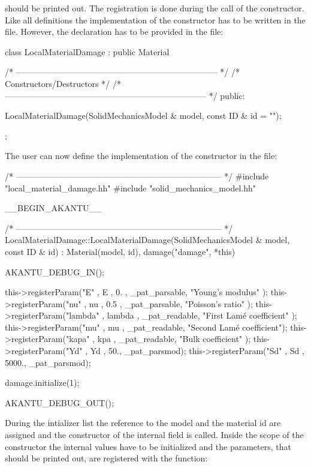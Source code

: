 should be printed out. The registration is done during the call of the
constructor. Like all definitions the implementation of the
constructor has to be written in the 
file. However, the declaration has to be provided in the
 file:
\begin{cpp}
class LocalMaterialDamage : public Material {
  /* ------------------------------------------------------------------------ */
  /* Constructors/Destructors                                                 */
  /* ------------------------------------------------------------------------ */
public:

  LocalMaterialDamage(SolidMechanicsModel & model, const ID & id = "");
};
\end{cpp}
The user can now define the implementation of the constructor in the
 file:
\begin{cpp}
/* -------------------------------------------------------------------------- */
#include "local_material_damage.hh"
#include "solid_mechanics_model.hh"

__BEGIN_AKANTU__

/* -------------------------------------------------------------------------- */
LocalMaterialDamage::LocalMaterialDamage(SolidMechanicsModel & model,
					 const ID & id)  :
  Material(model, id),
  damage("damage", *this) {
  AKANTU_DEBUG_IN();

  this->registerParam("E"           , E           , 0.   , _pat_parsable, "Young's modulus"        );
  this->registerParam("nu"          , nu          , 0.5  , _pat_parsable, "Poisson's ratio"        );
  this->registerParam("lambda"      , lambda             , _pat_readable, "First Lamé coefficient" );
  this->registerParam("mu"          , mu                 , _pat_readable, "Second Lamé coefficient");
  this->registerParam("kapa"        , kpa                , _pat_readable, "Bulk coefficient"       );
  this->registerParam("Yd"          , Yd          ,   50., _pat_parsmod);
  this->registerParam("Sd"          , Sd          , 5000., _pat_parsmod);

  damage.initialize(1);

  AKANTU_DEBUG_OUT();
}
\end{cpp}
During the intializer list the reference to the model and the material id are assigned and the constructor of the internal field is called. Inside the scope of the constructor the internal values have to be initialized and the parameters, that should be printed out,  are registered with the function:

